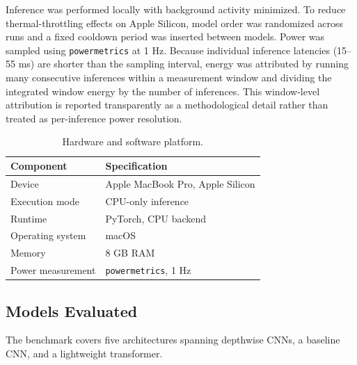 \documentclass[conference]{IEEEtran}
\begin{document}
Inference was performed locally with background activity minimized. To reduce
thermal-throttling effects on Apple Silicon, model order was randomized across
runs and a fixed cooldown period was inserted between models. Power was sampled
using \texttt{powermetrics} at 1 Hz. Because individual inference latencies
(15--55 ms) are shorter than the sampling interval, energy was attributed by
running many consecutive inferences within a measurement window and dividing
the integrated window energy by the number of inferences. This window-level
attribution is reported transparently as a methodological detail rather than
treated as per-inference power resolution.

\begin{table}[ht]
\centering
\caption{Hardware and software platform.}
\begin{tabular}{ll}
\toprule
Component & Specification \\
\midrule
Device & Apple MacBook Pro, Apple Silicon \\
Execution mode & CPU-only inference \\
Runtime & PyTorch, CPU backend \\
Operating system & macOS \\
Memory & 8 GB RAM \\
Power measurement & \texttt{powermetrics}, 1 Hz \\
\bottomrule
\end{tabular}
\end{table}

\subsection{Models Evaluated}
The benchmark covers five architectures spanning depthwise CNNs, a baseline
CNN, and a lightweight transformer.

\begin{table}[ht]
\centering
\caption{Architectures evaluated.}
\end{table}
\end{document}
